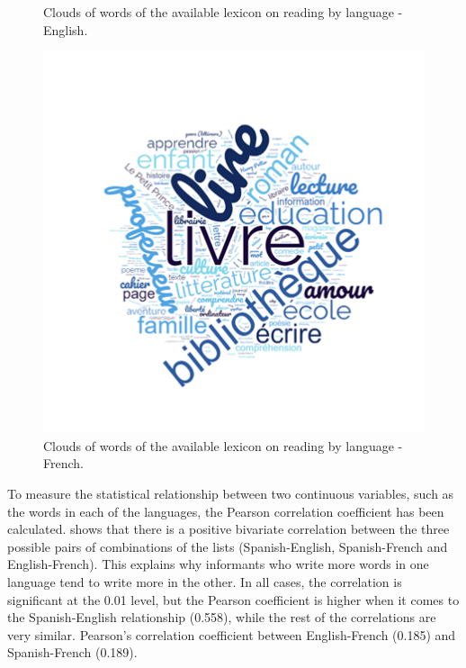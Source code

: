 \documentclass[english]{textolivre}
\begin{document}
\begin{figure}[htbp]
\begin{minipage}{0.30\textwidth}
 \caption{Clouds of words of the available lexicon on reading by language - English.}
 \label{fig3}
 \end{minipage}%
  \qquad
 \begin{minipage}{0.30\textwidth}
 \includegraphics[width=\textwidth]{Fig4.png}
 \caption{Clouds of words of the available lexicon on reading by language - French.}
 \label{fig4}
 \end{minipage}%
\end{figure}

 To measure the statistical relationship between two continuous variables, such as the words in each of the languages, the Pearson correlation coefficient has been calculated.  shows that there is a positive bivariate correlation between the three possible pairs of combinations of the lists (Spanish-English, Spanish-French and English-French). This explains why informants who write more words in one language tend to write more in the other. In all cases, the correlation is significant at the 0.01 level, but the Pearson coefficient is higher when it comes to the Spanish-English relationship (0.558), while the rest of the correlations are very similar. Pearson’s correlation coefficient between English-French (0.185) and Spanish-French (0.189).
\end{document}
